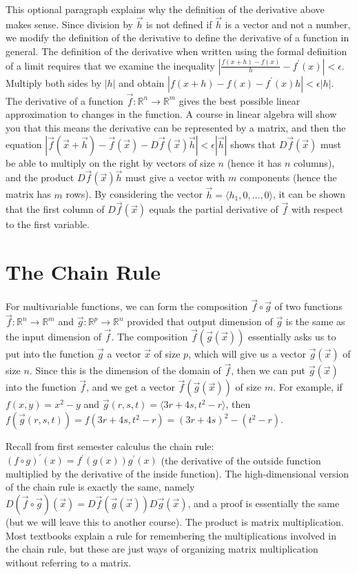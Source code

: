 This optional paragraph explains why the definition of the derivative
above makes sense. Since division by $\vec h$ is not defined if $\vec
h$ is a vector and not a number, we modify the definition of the
derivative to define the derivative of a function in general. The
definition of the derivative when written using the formal definition
of a limit requires that we examine the inequality
$|\frac{f(x+h)-f(x)}{h} - f^\prime(x)|<\epsilon$.  Multiply both sides by $|h|$
and obtain $|f(x+h)-f(x) - f^\prime(x)h|<\epsilon|h|$. The derivative of a
function $\vec f:\mathbb{R}^n\to\mathbb{R}^m$ gives the best possible
linear approximation to changes in the function. A course in linear
algebra will show you that this means the derivative can be
represented by a matrix, and then the equation $|\vec f(\vec x+\vec
h)-\vec f(\vec x) - D\vec f(\vec x)\vec h|<\epsilon|\vec h|$ shows that
$D\vec f(\vec x)$ must be able to multiply on the right by vectors of
size $n$ (hence it has $n$ columns), and the product $D\vec f(\vec
x)\vec h$ must give a vector with $m$ components (hence the matrix has
$m$ rows). By considering the vector $\vec h =
\langle h_1,0,\ldots,0\rangle$, it can be shown that the first column of
$D\vec f(\vec x)$ equals the partial derivative of $\vec f$ with
respect to the first variable. 
 
\section{The Chain Rule}
For multivariable functions, we can form the composition $\vec f\circ \vec
g$ of two functions $\vec f:\mathbb{R}^n\to \mathbb{R}^m$ and $\vec
g:\mathbb{R}^p\to \mathbb{R}^n$ provided that output dimension of $\vec
g$ is the same as the input dimension of $\vec f$.  The composition
$\vec f(\vec g(\vec x))$ essentially asks us to put into the function
$\vec g$ a vector $\vec x$ of size $p$, which will give us a vector
$\vec g(\vec x)$ of size $n$.  Since this is the dimension of the
domain of $\vec f$, then we can put $\vec g(\vec x)$ into the function
$\vec f$, and we get a vector $\vec f(\vec g(\vec x))$ of size $m$.
For example, if $f(x,y)=x^2-y$ and $\vec
g(r,s,t)=\langle3r+4s,t^2-r\rangle$, then $f(\vec g(r,s,t)) =
f(3r+4s,t^2-r) = (3r+4s)^2-(t^2-r)$.

Recall from first semester calculus the chain rule: {$(f\circ g)^\prime(x) =
  f^\prime(g(x))g^\prime(x)$} (the derivative of the outside function multiplied
by the derivative of the inside function). The high-dimensional
version of the chain rule is exactly the same, namely {$D(\vec f\circ \vec
  g)(\vec x) = D\vec f(\vec g(\vec x))D\vec g(\vec x)$}, and a proof
is essentially the same (but we will leave this to another course).
The product is matrix multiplication. Most textbooks explain a rule
for remembering the multiplications involved in the chain rule, but
these are just ways of organizing matrix multiplication without
referring to a matrix.

